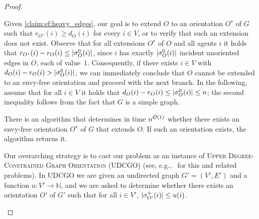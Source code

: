 \begin{proof}
\begin{nestedproof}
    \end{nestedproof}
    Given \cref{claim:ef:heavy_edges},
    our goal is to extend $O$ to an orientation $O^\star$ of $G$ such that $r_{O^\star}(i) \ge d_{O}(i)$ for every $i \in V$,
    or to verify that such an extension does not exist.
    Observe that for all extensions $O^\star$ of $O$ and all agents $i$ it holds that $r_{O^\star}(i) - r_O(i) \le |\sigma^0_O(i)|$,
    since $i$ has exactly $|\sigma^0_O(i)|$ incident unoriented edges in $O$, each of value~$1$.
    Consequently, if there exists $i \in V$ with $d_O(i) - r_O(i) > |\sigma^0_O(i)|$,
    we can immediately conclude that $O$ cannot be extended to an envy-free orientation and proceed with the next branch.
    In the following, assume that for all $i \in V$ it holds that $d_O(i) - r_O(i) \le |\sigma^0_O(i)| \le n$;
    the second inequality follows from the fact that $G$ is a simple graph.

    \begin{claim}\label{claim:ef:heavy_edges:UDCGO}
        There is an algorithm that determines in time $n^{\mathcal{O}(1)}$ whether there exists an envy-free orientation $O^\star$ of $G$
        that extends $O$. If such an orientation exists, the algorithm returns it.
    \end{claim}

    \begin{nestedproof}
        Our overarching strategy is to cast our problem as an instance of \textsc{Upper Degree-Constrained Graph Orientation} (UDCGO)
        (see, e.g.,~\cite{approx/CyganK15,FrankGyarfas1978,soda/Gabow06} for this and related problems).
        In UDCGO we are given an undirected graph $G' = (V',E')$ and a function $u \colon V' \to \mathbb{N}$,
        and we are asked to determine whether there exists
        an orientation $O'$ of $G'$ such that for all $i \in V'$, $|\sigma^+_{O'}(i)| \le u(i)$.



\end{nestedproof}
\end{proof}
